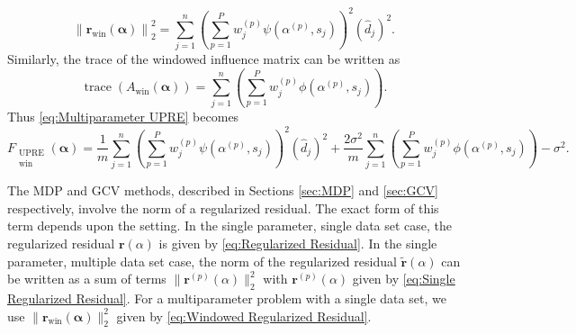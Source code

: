 \documentclass[12pt]{article}
\newcommand{\mA}{m}	%
\newcommand{\rVec}{\mathbf{r}}	%
\DeclareMathOperator{\trace}{trace}		%
\newcommand{\dft}[1]{\widehat{#1}}	%
\newcommand{\regparam}{\alpha}  %
\newcommand{\regparamVec}{\bm{\regparam}}   %
\newcommand{\rBig}{\widetilde{\rVec}}	%
\newcommand{\filt}{\phi}
\newcommand{\mfilt}{\psi}
\newcommand{\noiseSD}{\sigma}	%
\newcommand{\singular}{s}	%
\newcommand{\UWin}{F_{\substack{\text{UPRE} \\ \text{win}}}}	%
\begin{document}
\begin{equation}
\label{eq:Windowed Regularized Residual}
    \left\|\rVec_\text{win}(\regparamVec)\right\|_2^2 = \sum_{j=1}^{n} \left(\sum_{p=1}^{P} w_j^{(p)} \mfilt\left(\regparam^{(p)},\singular_j\right) \right)^2 \left(\dft{d}_j\right)^2.
\end{equation}
Similarly, the trace of the windowed influence matrix can be written as
\begin{equation}
    \trace\left(A_\text{win}(\regparamVec)\right) = \sum_{j=1}^{n} \left(\sum_{p=1}^{P} w_j^{(p)} \filt\left(\regparam^{(p)},\singular_j\right) \right).
\end{equation}
Thus \eqref{eq:Multiparameter UPRE} becomes
\begin{equation}
\label{eq:Multiparameter UPRE 2}
    \UWin(\regparamVec) = \frac{1}{\mA}\sum_{j=1}^{n} \left(\sum_{p=1}^{P} w_j^{(p)} \mfilt\left(\regparam^{(p)},\singular_j\right) \right)^2 \left(\dft{d}_j\right)^2 + \frac{2\noiseSD^2}{\mA}\sum_{j=1}^{n} \left(\sum_{p=1}^{P} w_j^{(p)} \filt\left(\regparam^{(p)},\singular_j\right) \right) - \noiseSD^2.
\end{equation}

The MDP and GCV methods, described in Sections \ref{sec:MDP} and \ref{sec:GCV} respectively, involve the norm of a regularized residual. The exact form of this term depends upon the setting. In the single parameter, single data set case, the regularized residual $\rVec(\regparam)$ is given by \eqref{eq:Regularized Residual}. In the single parameter, multiple data set case, the norm of the regularized residual $\rBig(\regparam)$ can be written as a sum of terms $\|\rVec^{(p)}(\regparam)\|_2^2$ with $\rVec^{(p)}(\regparam)$ given by \eqref{eq:Single Regularized Residual}. For a multiparameter problem with a single data set, we use $\|\rVec_{\text{win}}(\regparamVec)\|_2^2$ given by \eqref{eq:Windowed Regularized Residual}. 
\end{document}
